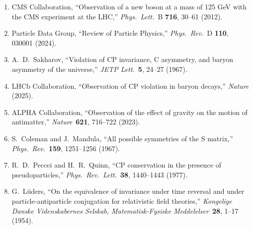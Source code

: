 \documentclass[12pt]{article}
\theoremstyle{definition}
\theoremstyle{remark}
\begin{document}
\begin{enumerate}
\item CMS Collaboration, ``Observation of a new boson at a mass of 125 GeV with the CMS experiment at the LHC,'' \textit{Phys.\ Lett.}\ B \textbf{716}, 30--61 (2012).

\item Particle Data Group, ``Review of Particle Physics,'' \textit{Phys.\ Rev.}\ D \textbf{110}, 030001 (2024).

\item A.~D.~Sakharov, ``Violation of CP invariance, C asymmetry, and baryon asymmetry of the universe,'' \textit{JETP Lett.}\ \textbf{5}, 24--27 (1967).

\item LHCb Collaboration, ``Observation of CP violation in baryon decays,'' \textit{Nature} (2025).

\item ALPHA Collaboration, ``Observation of the effect of gravity on the motion of antimatter,'' \textit{Nature}\ \textbf{621}, 716--722 (2023).

\item S.~Coleman and J.~Mandula, ``All possible symmetries of the S matrix,'' \textit{Phys.\ Rev.}\ \textbf{159}, 1251--1256 (1967).

\item R.~D.~Peccei and H.~R.~Quinn, ``CP conservation in the presence of pseudoparticles,'' \textit{Phys.\ Rev.\ Lett.}\ \textbf{38}, 1440--1443 (1977).

\item G.~L\"uders, ``On the equivalence of invariance under time reversal and under particle-antiparticle conjugation for relativistic field theories,'' \textit{Kongelige Danske Videnskabernes Selskab, Matematisk-Fysiske Meddelelser}\ \textbf{28}, 1--17 (1954).
\end{enumerate}
\end{document}
